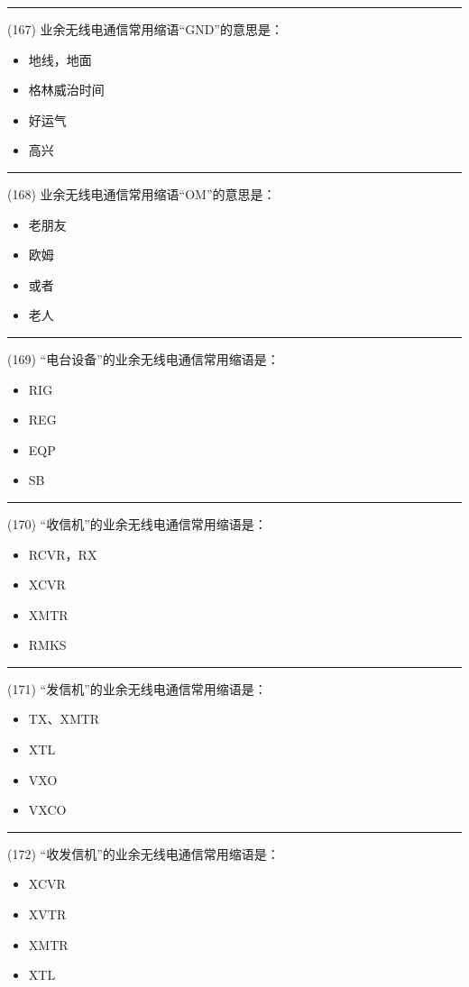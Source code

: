 \documentclass[twocolumn,hyperref,UTF8]{ctexart}  %
\begin{document}
\noindent\rule{0.5\textwidth}{1pt}
\heiti (167) 业余无线电通信常用缩语“GND”的意思是： \songti {\color{gray} [LK0361] }
\begin{itemize}
	\item  地线，地面
	\item  格林威治时间
	\item  好运气
	\item  高兴
\end{itemize}


\noindent\rule{0.5\textwidth}{1pt}
\heiti (168) 业余无线电通信常用缩语“OM”的意思是： \songti {\color{gray} [LK0373] }
\begin{itemize}
	\item  老朋友
	\item  欧姆
	\item  或者
	\item  老人
\end{itemize}


\noindent\rule{0.5\textwidth}{1pt}
\heiti (169) “电台设备”的业余无线电通信常用缩语是： \songti {\color{gray} [LK0376] }
\begin{itemize}
	\item  RIG
	\item  REG
	\item  EQP
	\item  SB
\end{itemize}


\noindent\rule{0.5\textwidth}{1pt}
\heiti (170) “收信机”的业余无线电通信常用缩语是： \songti {\color{gray} [LK0379] }
\begin{itemize}
	\item  RCVR，RX
	\item  XCVR
	\item  XMTR
	\item  RMKS
\end{itemize}


\noindent\rule{0.5\textwidth}{1pt}
\heiti (171) “发信机”的业余无线电通信常用缩语是： \songti {\color{gray} [LK0380] }
\begin{itemize}
	\item  TX、XMTR
	\item  XTL
	\item  VXO
	\item  VXCO
\end{itemize}


\noindent\rule{0.5\textwidth}{1pt}
\heiti (172) “收发信机”的业余无线电通信常用缩语是： \songti {\color{gray} [LK0381] }
\begin{itemize}
	\item  XCVR
	\item  XVTR
	\item  XMTR
	\item  XTL
\end{itemize}
\end{document}
